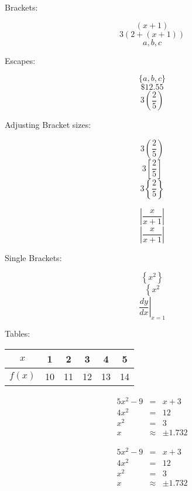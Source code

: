 \documentclass[11pt]{article}
\begin{document}
Brackets:

$$ (x + 1) $$
$$ 3(2 + ( x + 1)) $$
$$ {a, b, c} $$

Escapes:

$$ \{a, b, c\}  $$
$$ \$12.55 $$
$$ 3(\frac{2}{5}) $$

Adjusting Bracket sizes:

$$ 3\left(\frac{2}{5}\right) $$
$$ 3\left[\frac{2}{5}\right] $$
$$ 3\left\{\frac{2}{5}\right\} $$

$$ |\frac{x}{x + 1}| $$
$$ \left|\frac{x}{x+1}\right| $$

Single Brackets:

$$ \left\{x^2\right\} $$
$$ \left\{x^2\right. $$
$$ \displaystyle{\left. \frac{dy}{dx} \right|_{x = 1}} $$

Tables:

\begin{tabular}{|c|c|c|c|c|c|}
\hline
$x$     & 1 &2  &3  &4  &5 \\ \hline
$f(x)$  &10 &11 &12 &13 &14 \\ \hline

\end{tabular}


\begin{eqnarray}
5x^2 - 9 &=& x + 3 \\
4x^2 &=& 12 \\
x^2 &=& 3 \\
x &\approx& \pm 1.732
\end{eqnarray}


\begin{eqnarray*}
5x^2 - 9 &=& x + 3 \\
4x^2 &=& 12 \\
x^2 &=& 3 \\
x &\approx& \pm 1.732
\end{eqnarray*}
\end{document}
